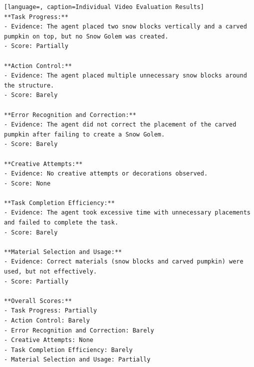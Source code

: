 \begin{lstlisting}[language=, caption=Individual Video Evaluation Results]
**Task Progress:**
- Evidence: The agent placed two snow blocks vertically and a carved pumpkin on top, but no Snow Golem was created.
- Score: Partially

**Action Control:**
- Evidence: The agent placed multiple unnecessary snow blocks around the structure.
- Score: Barely

**Error Recognition and Correction:**
- Evidence: The agent did not correct the placement of the carved pumpkin after failing to create a Snow Golem.
- Score: Barely

**Creative Attempts:**
- Evidence: No creative attempts or decorations observed.
- Score: None

**Task Completion Efficiency:**
- Evidence: The agent took excessive time with unnecessary placements and failed to complete the task.
- Score: Barely

**Material Selection and Usage:**
- Evidence: Correct materials (snow blocks and carved pumpkin) were used, but not effectively.
- Score: Partially

**Overall Scores:**
- Task Progress: Partially
- Action Control: Barely
- Error Recognition and Correction: Barely
- Creative Attempts: None
- Task Completion Efficiency: Barely
- Material Selection and Usage: Partially
\end{lstlisting}
